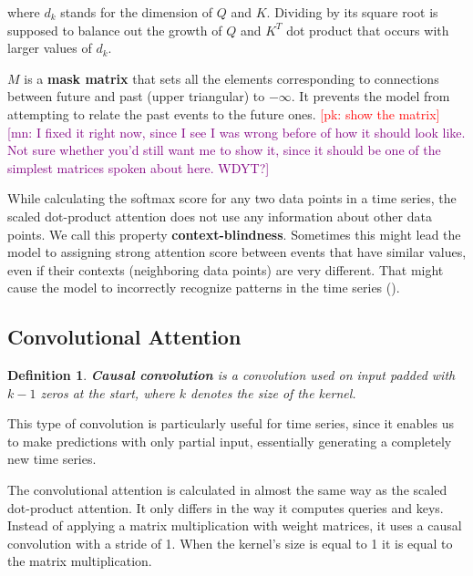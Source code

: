 \documentclass[en]{pracamgr}
\newtheorem{defi}{Definition}[section]
\newcommand{\pk}[1]{\textcolor{red}{\small [pk: #1]}}
\newcommand{\mn}[1]{\textcolor{purple}{\small [mn: #1]}}
\begin{document}
where $d_k$ stands for the dimension of $Q$ and $K$. Dividing by its square root is supposed to balance out the growth of $Q$ and $K^{T}$ dot product that occurs with larger values of $d_k$.

$M$ is a \textbf{mask matrix} that sets all the elements corresponding to connections between future and past (upper triangular) to $-\infty$. It prevents the model from attempting to relate the past events to the future ones. \pk{show the matrix} \mn{I fixed it right now, since I see I was wrong before of how it should look like. Not sure whether you'd still want me to show it, since it should be one of the simplest matrices spoken about here. WDYT?}




While calculating the softmax score for any two data points in a time series, the scaled dot-product attention does not use any information about other data points. We call this property \textbf{context-blindness}. Sometimes this might lead the model to assigning strong attention score between events that have similar values, even if their contexts (neighboring data points) are very different. That might cause the model to incorrectly recognize patterns in the time series (\cite{enhancing}).

\subsection{Convolutional Attention}

\begin{defi}\label{ts}
	\textbf{Causal convolution} is a convolution used on input padded with $k - 1$ zeros at the start, where $k$ denotes the size of the kernel.
	
\end{defi}
%
This type of convolution is particularly useful for time series, since it enables us to make predictions with only partial input, essentially generating a completely new time series.
\newline

The convolutional attention \cite{enhancing} is calculated in almost the same way as the scaled dot-product attention. 
It only differs in the way it computes queries and keys.
Instead of applying a matrix multiplication with weight matrices, it uses a causal convolution with a stride of 1. When the kernel's size is equal to 1 it is equal to the matrix multiplication.
\end{document}
